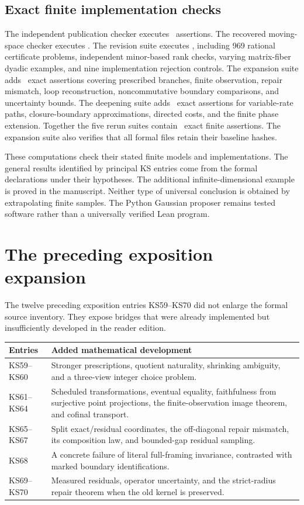 \documentclass[11pt]{article}
\begin{document}
\subsection{Exact finite implementation checks}
The independent publication checker executes \EditionOriginalChecks\ assertions. The recovered moving-space checker executes \EditionRecoveredChecks. The revision suite executes \EditionRevisionChecks, including 969 rational certificate problems, independent minor-based rank checks, varying matrix-fiber dyadic examples, and nine implementation rejection controls. The expansion suite adds \EditionExpansionChecks\ exact assertions covering prescribed branches, finite observation, repair mismatch, loop reconstruction, noncommutative boundary comparisons, and uncertainty bounds. The deepening suite adds \EditionDeepeningChecks\ exact assertions for variable-rate paths, closure-boundary approximations, directed costs, and the finite phase extension. Together the five rerun suites contain \EditionTotalChecks\ exact finite assertions. The expansion suite also verifies that all formal files retain their baseline hashes.

These computations check their stated finite models and implementations. The general results identified by principal KS entries come from the formal declarations under their hypotheses. The additional infinite-dimensional example is proved in the manuscript. Neither type of universal conclusion is obtained by extrapolating finite samples. The Python Gaussian proposer remains tested software rather than a universally verified Lean program.

\section{The preceding exposition expansion}
The twelve preceding exposition entries KS59--KS70 did not enlarge the formal source inventory. They expose bridges that were already implemented but insufficiently developed in the reader edition.

\begin{center}
\begin{tabularx}{\linewidth}{@{}p{.18\linewidth}X@{}}
\toprule Entries & Added mathematical development\\\midrule
KS59--KS60 & Stronger prescriptions, quotient naturality, shrinking ambiguity, and a three-view integer choice problem.\\
KS61--KS64 & Scheduled transformations, eventual equality, faithfulness from surjective point projections, the finite-observation image theorem, and cofinal transport.\\
KS65--KS67 & Split exact/residual coordinates, the off-diagonal repair mismatch, its composition law, and bounded-gap residual sampling.\\
KS68 & A concrete failure of literal full-framing invariance, contrasted with marked boundary identifications.\\
KS69--KS70 & Measured residuals, operator uncertainty, and the strict-radius repair theorem when the old kernel is preserved.\\
\bottomrule
\end{tabularx}
\end{center}
\end{document}
